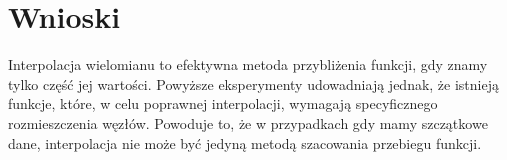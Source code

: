 \documentclass{article}
\begin{document}
\section{Wnioski}

Interpolacja wielomianu to efektywna metoda przybliżenia funkcji, gdy znamy tylko część jej wartości.
Powyższe eksperymenty udowadniają jednak, że istnieją funkcje, które, w celu poprawnej interpolacji, wymagają specyficznego rozmieszczenia węzłów.
Powoduje to, że w przypadkach gdy mamy szczątkowe dane, interpolacja nie może być jedyną metodą szacowania przebiegu funkcji.
\end{document}
